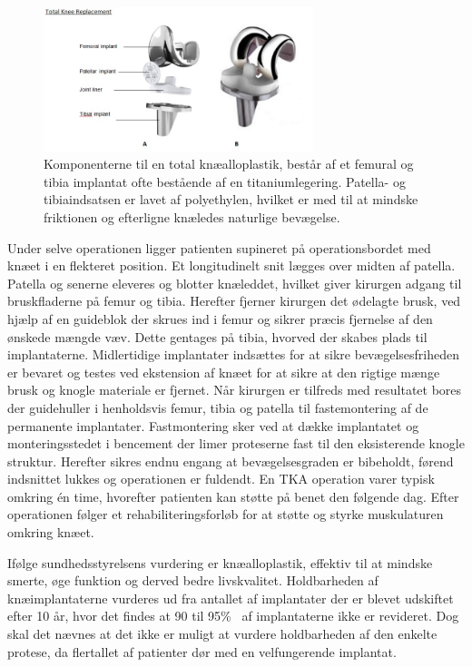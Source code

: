\begin{figure}[H] 
\begin{center}
\includegraphics[width=0.7\textwidth]{figures/tka_implant}
\end{center}
\caption{Komponenterne til en total knæalloplastik, består af et femural og tibia implantat ofte bestående af en titaniumlegering. Patella- og tibiaindsatsen er lavet af polyethylen, hvilket er med til at mindske friktionen og efterligne knæledes naturlige bevægelse.\cite{1}} 
\label{fig:tka_implant} 
\end{figure}

Under selve operationen ligger patienten supineret på operationsbordet med knæet i en flekteret position. Et longitudinelt snit lægges over midten af patella. Patella og senerne eleveres og blotter knæleddet, hvilket giver kirurgen adgang til bruskfladerne på femur og tibia. Herefter fjerner kirurgen det ødelagte brusk, ved hjælp af en guideblok der skrues ind i femur og sikrer præcis fjernelse af den ønskede mængde væv. Dette gentages på tibia, hvorved der skabes plads til implantaterne. Midlertidige implantater indsættes for at sikre bevægelsesfriheden er bevaret og testes ved ekstension af knæet for at sikre at den rigtige mænge brusk og knogle materiale er fjernet. Når kirurgen er tilfreds med resultatet bores der guidehuller i henholdsvis femur, tibia og patella til fastemontering af de permanente implantater. Fastmontering sker ved at dække implantatet og monteringsstedet i bencement der limer proteserne fast til den eksisterende knogle struktur. Herefter sikres endnu engang at bevægelsesgraden er bibeholdt, førend indsnittet lukkes og operationen er fuldendt. En TKA operation varer typisk omkring én time, hvorefter patienten kan støtte på benet den følgende dag. Efter operationen følger et rehabiliteringsforløb for at støtte og styrke muskulaturen omkring knæet. \citep{Sanna2013} \citep{tka-technique}

Ifølge sundhedsstyrelsens vurdering er knæalloplastik, effektiv til at mindske smerte, øge funktion og derved bedre livskvalitet. Holdbarheden af knæimplantaterne vurderes ud fra antallet af implantater der er blevet udskiftet efter 10 år, hvor det findes at 90 til 95\%~ af implantaterne ikke er revideret. Dog skal det nævnes at det ikke er muligt at vurdere holdbarheden af den enkelte protese, da flertallet af patienter dør med en velfungerende implantat. \citep{brostrom2012}

